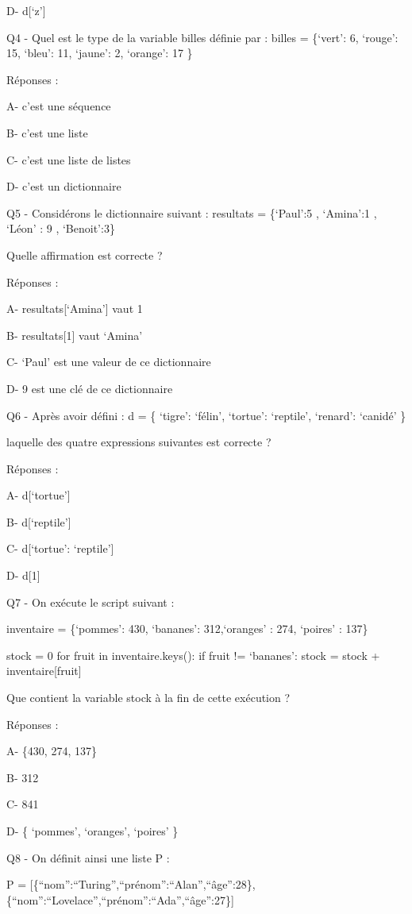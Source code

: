 \documentclass[
]{book}
\begin{document}
D- d{[}`z'{]}

Q4 - Quel est le type de la variable billes définie par : billes = \{`vert': 6, `rouge': 15, `bleu': 11, `jaune': 2, `orange': 17 \}

Réponses :

A- c'est une séquence

B- c'est une liste

C- c'est une liste de listes

D- c'est un dictionnaire

Q5 - Considérons le dictionnaire suivant : resultats = \{`Paul':5 , `Amina':1 , `Léon' : 9 , `Benoit':3\}

Quelle affirmation est correcte ?

Réponses :

A- resultats{[}`Amina'{]} vaut 1

B- resultats{[}1{]} vaut `Amina'

C- `Paul' est une valeur de ce dictionnaire

D- 9 est une clé de ce dictionnaire

Q6 - Après avoir défini : d = \{ `tigre': `félin', `tortue': `reptile', `renard': `canidé' \}

laquelle des quatre expressions suivantes est correcte ?

Réponses :

A- d{[}`tortue'{]}

B- d{[}`reptile'{]}

C- d{[}`tortue': `reptile'{]}

D- d{[}1{]}

Q7 - On exécute le script suivant :

inventaire = \{`pommes': 430, `bananes': 312,`oranges' : 274, `poires' : 137\}

stock = 0
for fruit in inventaire.keys():
if fruit != `bananes':
stock = stock + inventaire{[}fruit{]}

Que contient la variable stock à la fin de cette exécution ?

Réponses :

A- \{430, 274, 137\}

B- 312

C- 841

D- \{ `pommes', `oranges', `poires' \}

Q8 - On définit ainsi une liste P :

P = {[}\{``nom'':``Turing'',``prénom'':``Alan'',``âge'':28\},\{``nom'':``Lovelace'',``prénom'':``Ada'',``âge'':27\}{]}
\end{document}
